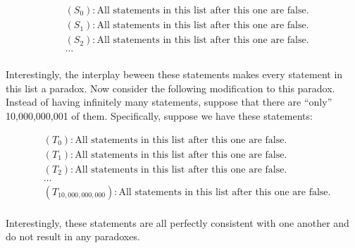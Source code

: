 \documentclass[10pt,letter]{article}
\begin{document}
\begin{align*}
&(S_0): \text{All statements in this list after this one are false.}\\
&(S_1): \text{All statements in this list after this one are false.}\\
&(S_2): \text{All statements in this list after this one are false.}\\
&\ldots\\
\end{align*}


Interestingly, the interplay beween these statements makes every statement in this list a paradox. Now consider the following modification to this paradox. Instead of having infinitely many statements, suppose that there are ``only'' 10,000,000,001 of them. Specifically, suppose we have these statements:

\begin{align*}
&(T_0): \text{All statements in this list after this one are false.}\\
&(T_1): \text{All statements in this list after this one are false.}\\
&(T_2): \text{All statements in this list after this one are false.}\\
&\ldots\\
&(T_{10,000,000,000}): \text{All statements in this list after this one are false.}\\
\end{align*}

Interestingly, these statements are all perfectly consistent with one another and do not result in any paradoxes.
\end{document}
